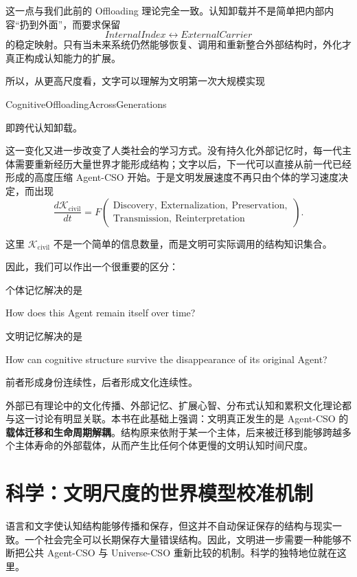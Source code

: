 这一点与我们此前的 Offloading 理论完全一致。认知卸载并不是简单把内部内容“扔到外面”，而要求保留
\[
InternalIndex
\leftrightarrow
ExternalCarrier
\]
的稳定映射。只有当未来系统仍然能够恢复、调用和重新整合外部结构时，外化才真正构成认知能力的扩展。

所以，从更高尺度看，文字可以理解为文明第一次大规模实现
\begin{statementbox}
CognitiveOffloadingAcrossGenerations
\end{statementbox}
即跨代认知卸载。

这一变化又进一步改变了人类社会的学习方式。没有持久化外部记忆时，每一代主体需要重新经历大量世界才能形成结构；文字以后，下一代可以直接从前一代已经形成的高度压缩 Agent-CSO 开始。于是文明发展速度不再只由个体的学习速度决定，而出现
\[
\frac{d\mathcal{K}_{\mathrm{civil}}}{dt}
=
F\!\left(
\begin{gathered}
\mathrm{Discovery},\ \mathrm{Externalization},\ \mathrm{Preservation},\\
\mathrm{Transmission},\ \mathrm{Reinterpretation}
\end{gathered}
\right).
\]

这里 $\mathcal{K}_{\mathrm{civil}}$ 不是一个简单的信息数量，而是文明可实际调用的结构知识集合。

因此，我们可以作出一个很重要的区分：

个体记忆解决的是
\begin{statementbox}
How does this Agent remain itself over time?
\end{statementbox}

文明记忆解决的是
\begin{statementbox}
How can cognitive structure survive the disappearance of its original Agent?
\end{statementbox}

前者形成身份连续性，后者形成文化连续性。

外部已有理论中的文化传播、外部记忆、扩展心智、分布式认知和累积文化理论都与这一讨论有明显关联。本书在此基础上强调：文明真正发生的是 Agent-CSO 的\textbf{载体迁移和生命周期解耦}。结构原来依附于某一个主体，后来被迁移到能够跨越多个主体寿命的外部载体，从而产生比任何个体更慢的文明认知时间尺度。


\section{科学：文明尺度的世界模型校准机制}

语言和文字使认知结构能够传播和保存，但这并不自动保证保存的结构与现实一致。一个社会完全可以长期保存大量错误结构。因此，文明进一步需要一种能够不断把公共 Agent-CSO 与 Universe-CSO 重新比较的机制。科学的独特地位就在这里。

